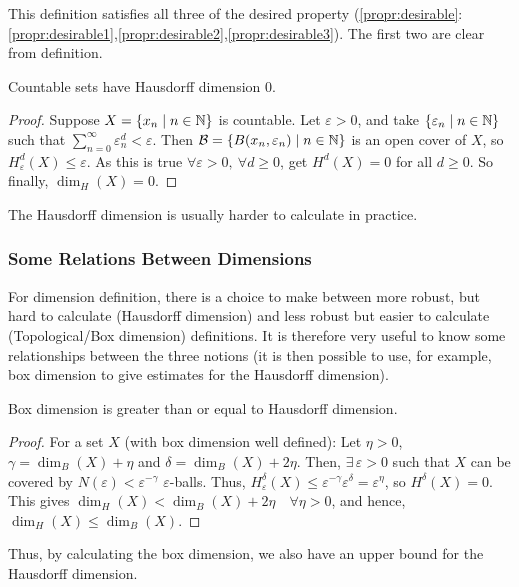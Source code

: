 This definition satisfies all three of the desired property (\ref{propr:desirable}:\ref{propr:desirable1},\ref{propr:desirable2},\ref{propr:desirable3}).
The first two are clear from definition.
\begin{property}
	Countable sets have Hausdorff dimension 0.
\end{property}
\begin{proof}
	Suppose $X = \{ x_n \mid n \in \mathbb{N} \}$ is countable.
	Let $\varepsilon > 0$, and take $\{ \varepsilon_n \mid n \in \mathbb{N} \}$ such that $\sum_{n=0}^{\infty} \varepsilon_n^d < \varepsilon$.
	Then $\mathcal{B} = \{ B(x_n,\varepsilon_n) \mid n \in \mathbb{N} \}$ is an open cover of $X$, so $H_{\varepsilon}^d(X) \leq \varepsilon$.
	As this is true $\forall \varepsilon > 0, \ \forall d \geq 0$, get $H^d(X) = 0$ for all $d \geq 0$.
	So finally, $\dim_H(X) = 0$.
\end{proof}

The Hausdorff dimension is usually harder to calculate in practice.

\subsubsection{Some Relations Between Dimensions}
For dimension definition, there is a choice to make between more robust, but hard to calculate (Hausdorff dimension) and less robust but easier to calculate (Topological/Box dimension) definitions.
It is therefore very useful to know some relationships between the three notions (it is then possible to use, for example, box dimension to give estimates for the Hausdorff dimension).

\begin{property}
	Box dimension is greater than or equal to Hausdorff dimension.
\end{property}
\begin{proof}
	For a set $X$ (with box dimension well defined):
	Let $\eta > 0$, $\gamma = \dim_B(X) + \eta$ and $\delta = \dim_B(X) + 2\eta$.
	Then, $\exists \, \varepsilon > 0$ such that $X$ can be covered by $N(\varepsilon) < \varepsilon^{-\gamma}$ $\varepsilon$-balls.
	Thus, $H_{\varepsilon}^{\delta}(X) \leq \varepsilon^{-\gamma}\varepsilon^{\delta} = \varepsilon^{\eta}$, so $H^{\delta}(X) = 0$.
	This gives $\dim_H(X) < \dim_B(X) + 2\eta \quad \forall \eta > 0$, and hence, $\dim_H(X) \leq \dim_B(X)$.
\end{proof}

Thus, by calculating the box dimension, we also have an upper bound for the Hausdorff dimension.

